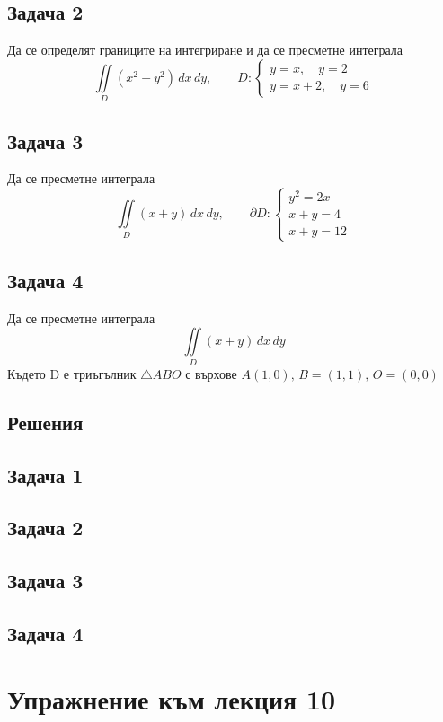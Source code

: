 \documentclass[a4paper,fleqn,12pt]{article}
\theoremstyle{definition}
\begin{document}
\subsection*{Задача 2}
Да се определят границите на интегриране и да се пресметне интеграла
$$\iint\limits_D (x^2 + y^2) \, dx \, dy, \qquad D: \begin{cases} y = x , \quad y =2 \\ y = x + 2, \quad y = 6 \end{cases}$$

\subsection*{Задача 3}
Да се пресметне интеграла
$$\iint\limits_D (x+y) \, dx \, dy, \qquad \partial D: \begin{cases} y^2 = 2x \\ x+y = 4 \\ x+y = 12 \end{cases}$$

\subsection*{Задача 4}
Да се пресметне интеграла
$$\iint\limits_D (x+y) \, dx \, dy$$
Където D е триъгълник $\triangle ABO$ с върхове $A(1,0),\, B = (1,1),\, O = (0,0)$

\newpage
\subsection{Решения}

\subsection*{Задача 1}

\subsection*{Задача 2}

\subsection*{Задача 3}

\subsection*{Задача 4}


\newpage 
\section{Упражнение към лекция 10}
\end{document}
